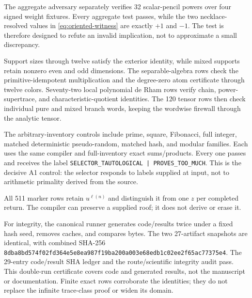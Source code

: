 The aggregate adversary separately verifies 32 scalar-pencil powers over four
signed weight fixtures.  Every aggregate test passes, while the two
necklace-resolved values in \eqref{eq:oriented-witness} are exactly \(+1\) and
\(-1\).  The test is therefore designed to refute an invalid implication, not
to approximate a small discrepancy.

Support sizes through twelve satisfy the exterior identity, while mixed
supports retain nonzero even and odd dimensions.  The separable-algebra rows
check the primitive-idempotent multiplication and the degree-zero atom
certificate through twelve colors.  Seventy-two local polynomial de Rham rows
verify chain, power-supertrace, and characteristic-quotient identities.  The
120 tensor rows then check individual pure and mixed branch words, keeping the
wordwise firewall through the analytic tensor.

The arbitrary-inventory controls include prime, square, Fibonacci, full
integer, matched deterministic pseudo-random, matched hash, and modular
families.  Each uses the same compiler and full-inventory exact sums/products.
Every one passes and receives the label
\texttt{SELECTOR\_TAUTOLOGICAL | PROVES\_TOO\_MUCH}.  This is the decisive A1
control: the selector responds to labels supplied at input, not to arithmetic
primality derived from the source.

All 511 marker rows retain \(u^{\ell(n)}\) and distinguish it from one \(z\)
per completed return.  The compiler can preserve a supplied roof; it does not
derive or erase it.

For integrity, the canonical runner generates code/results twice under a
fixed hash seed, removes caches, and compares bytes.  The two 27-artifact
snapshots are identical, with combined SHA-256
\texttt{8dba8bd574f02fd364e5e8ea987f19ba200a003e68edb1c02ee2f65ac77375e4}.
The 29-entry code/result SHA ledger and the route/scientific integrity audit
pass.  This double-run certificate covers code and generated results, not the
manuscript or documentation.  Finite exact rows corroborate the identities;
they do not replace the infinite trace-class proof or widen its domain.
